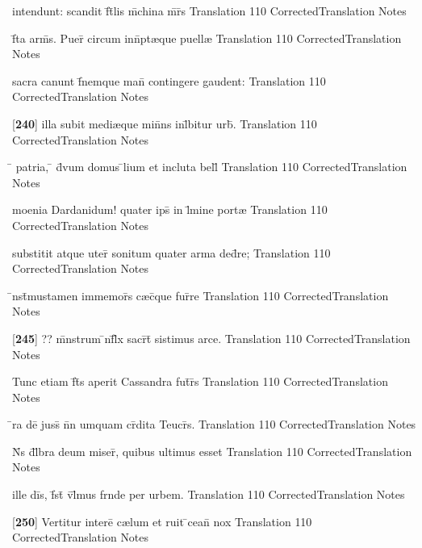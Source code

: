 \latline
  {intendunt: scandit f\={}t\={}lis m\={}china m\={}r\={}s}
  { Translation }
  {110}
  { CorrectedTranslation }
  { Notes }


\latline
  {f\={}ta arm\={\macron {\i}}s.  Puer\={\macron {\i}} circum inn\={}pt{\ae}que puell{\ae}}
  { Translation }
  {110}
  { CorrectedTranslation }
  { Notes }


\latline
  {sacra canunt f\={}nemque man\={} contingere gaudent:}
  { Translation }
  {110}
  { CorrectedTranslation }
  { Notes }


\latline
  {[\textbf{240}] illa subit medi{\ae}que min\={}ns inl\={}bitur urb\={\macron {\i}}.}
  { Translation }
  {110}
  { CorrectedTranslation }
  { Notes }


\latline
  {\={} patria, \={} d\={\macron {\i}}vum domus \={}lium et incluta bell\={}}
  { Translation }
  {110}
  { CorrectedTranslation }
  { Notes }


\latline
  {moenia Dardanidum! quater ips\={} in l\={\macron {\i}}mine port{\ae}}
  { Translation }
  {110}
  { CorrectedTranslation }
  { Notes }


\latline
  {substitit atque uter\={} sonitum quater arma ded\={}re;}
  { Translation }
  {110}
  { CorrectedTranslation }
  { Notes }


\latline
  {\={\macron {\i}}nst\={}mustamen immemor\={}s c{\ae}c\={\macron {\i}}que fur\={}re}
  { Translation }
  {110}
  { CorrectedTranslation }
  { Notes }


\latline
  {[\textbf{245}] ?? m\={}nstrum \={\macron {\i}}nf\={}l\={\macron {\i}}x sacr\={}t\={} sistimus arce.}
  { Translation }
  {110}
  { CorrectedTranslation }
  { Notes }


\latline
  {Tunc etiam f\={}t\={\macron {\i}}s aperit Cassandra fut\={}r\={\macron {\i}}s}
  { Translation }
  {110}
  { CorrectedTranslation }
  { Notes }


\latline
  {\={}ra de\={\macron {\i}}  juss\={} n\={}n umquam cr\={}dita Teucr\={\macron {\i}}s.}
  { Translation }
  {110}
  { CorrectedTranslation }
  { Notes }


\latline
  {N\={}s d\={}l\={}bra deum miser\={\macron {\i}}, quibus ultimus esset}
  { Translation }
  {110}
  { CorrectedTranslation }
  { Notes }


\latline
  {ille di\={}s, f\={}st\={} v\={}l\={}mus frnde per urbem.}
  { Translation }
  {110}
  { CorrectedTranslation }
  { Notes }


\latline
  {[\textbf{250}] Vertitur intere\={} c{\ae}lum et ruit \={}cean\={} nox}
  { Translation }
  {110}
  { CorrectedTranslation }
  { Notes }


